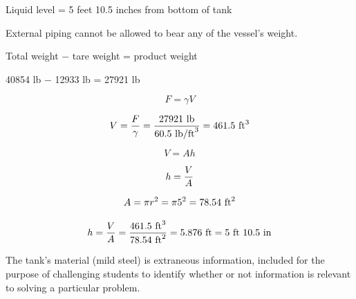 





Liquid level = 5 feet 10.5 inches from bottom of tank







External piping cannot be allowed to bear any of the vessel's weight.

\vskip 10pt

Total weight $-$ tare weight = product weight

\vskip 10pt

40854 lb $-$ 12933 lb = 27921 lb

$$F = \gamma V$$

$$V = {F \over \gamma} = {27921 \hbox{ lb} \over 60.5 \hbox{ lb/ft}^3} = 461.5 \hbox{ ft}^3$$

$$V = Ah$$

$$h = {V \over A}$$

$$A = \pi r^2 = \pi 5^2 = 78.54 \hbox{ ft}^2$$

$$h = {V \over A} = {461.5 \hbox{ ft}^3 \over 78.54 \hbox{ ft}^2} = 5.876 \hbox{ ft} = 5 \hbox{ ft } 10.5 \hbox{ in}$$

\vskip 10pt

The tank's material (mild steel) is extraneous information, included for the purpose of challenging students to identify whether or not information is relevant to solving a particular problem.




